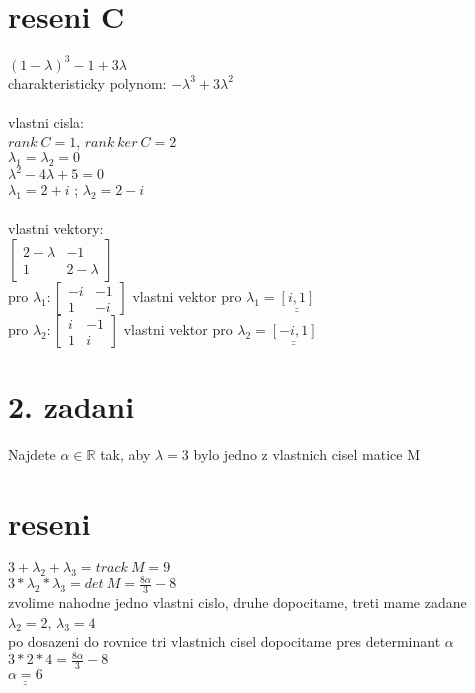 \documentclass[a4paper]{article}
\def\doubleunderline#1{\underline{\underline{#1}}}
\begin{document}
\section*{reseni C}
$(1-\lambda)^3-1+3\lambda$\\
charakteristicky polynom: \doubleunderline{$-\lambda^3+3\lambda^2$}\\
\\
vlastni cisla:\\
$rank~C = 1$, $rank~ker~C = 2$\\
$\lambda_1 = \lambda_2 = 0$\\
$\lambda^2-4\lambda+5=0$\\
\doubleunderline{$\lambda_1 = 2+i$} ; 
\doubleunderline{$\lambda_2 = 2-i$}\\
\\
vlastni vektory:\\
$
\left[\begin{matrix}
	2-\lambda & -1\\
	1 & 2-\lambda
	\end{matrix}\right]
$\\
pro $\lambda_1: \left[\begin{matrix}
	-i & -1\\
	1 & -i
	\end{matrix}\right]$
vlastni vektor pro $\lambda_1 = \doubleunderline{[i,1]}$\\
pro $\lambda_2: \left[\begin{matrix}
	i & -1\\
	1 & i
	\end{matrix}\right]$
vlastni vektor pro $\lambda_2 = \doubleunderline{[-i,1]}$\\










\section*{2. zadani}
Najdete $\alpha \in \mathbb{R}$ tak, aby $\lambda = 3$
bylo jedno z vlastnich cisel matice M\\


\section*{reseni}
$3+\lambda_2+\lambda_3=track~M=9$\\
$3*\lambda_2*\lambda_3=det~M=\frac{8\alpha}{3}-8$\\
zvolime nahodne jedno vlastni cislo, druhe dopocitame, treti mame zadane\\
$\lambda_2=2$, $\lambda_3=4$\\
po dosazeni do rovnice tri vlastnich cisel dopocitame pres determinant $\alpha$\\
$3*2*4=\frac{8\alpha}{3}-8$\\
$\doubleunderline{\alpha=6}$\\
\end{document}
